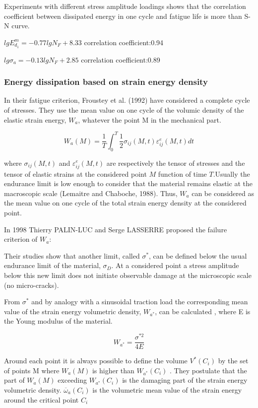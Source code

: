 \documentclass[3p,times,procedia,number]{elsarticle}
\begin{document}
Experiments with different stress amplitude loadings shows that the correlation coefficient between dissipated energy in one cycle and fatigue life is more than S-N curve.

$lgE_{d_1}^m=-0.77lgN_F+8.33$ correlation coefficient:0.94

$lg\sigma_a=-0.13lgN_F+2.85$ correlation coefficient:0.89


\subsubsection{Energy dissipation based on strain energy density}
In their fatigue criterion, Froustey et al. (1992)  have considered a complete cycle of
stresses. They use the mean value on one cycle of
the volumic density of the elastic strain energy, $W_a$, whatever the point
M in the mechanical part.

$$W_a(M)=\frac{1}{T}\int_{0}^{T}\frac{1}{2}\sigma_{ij}(M,t)\varepsilon_{ij}^e(M,t)dt$$

where $\sigma_{ij}(M,t)$ and $\varepsilon_{ij}^e(M,t)$ are respectively the tensor of stresses and the tensor of
elastic strains at the considered point $M$ function of time $T$.Usually the endurance limit
is low enough to consider that the material remains elastic at the macroscopic scale
(Lemaitre and Chaboche, 1988). Thus, $W_a$ can be considered as the mean value on one
cycle of the total strain energy density at the considered point.

In 1998 Thierry PALIN-LUC and Serge LASSERRE \cite{palin1998energy} proposed the failure criterion of $W_a$:

Their studies show that another limit, called $\sigma^*$, can be defined below
the usual endurance limit of the material, $\sigma_D$. At a considered point a stress amplitude
below this new limit does not initiate observable damage at the microscopic scale (no
micro-cracks).

From $\sigma^*$ and by analogy with a sinusoidal traction load the corresponding mean value
of the strain energy volumetric density, $W_{a^*}$, can be calculated , where E is the
Young modulus of the material.

$$W_{a^*}=\frac{\sigma^{*2}}{4E}$$

Around each point it is always possible to define
the volume $V^* (C_i)$ by the set of points M where $W_a (M)$ is higher than $W_{a^*} (C_i)$
. They postulate that the part of $W_a (M)$ exceeding $W_{a^*} (C_i)$ is the damaging part
of the strain energy volumetric density.  $\overline{\omega}_a(C_i)$ is
the volumetric mean value of the strain energy around the critical point $C_i$
\end{document}
